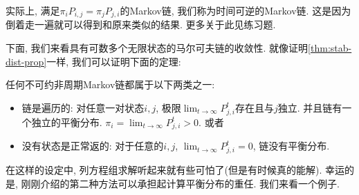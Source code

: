 实际上, 满足$\pi_i P_{i, j}=\pi_j P_{j, i}$的Markov链, 我们称为时间可逆的Markov链. 这是因为倒着走一遍就可以得到和原来类似的结果. 更多关于此见练习题. 

下面, 我们来看具有可数多个无限状态的马尔可夫链的收敛性. 就像证明\cref{thm:stab-dist-prop}一样, 我们可以证明下面的定理: 

\begin{theorem}
    任何不可约非周期Markov链都属于以下两类之一: 
    \begin{itemize}
        \item 链是遍历的: 对任意一对状态$i,j$, 极限$\lim _{t \rightarrow \infty} P_{j, i}^t$存在且与$j$独立. 并且链有一个独立的平衡分布. $\pi_i = \lim _{t \rightarrow \infty} P_{j, i}^t>0$. 或者
        \item 没有状态是正常返的: 对于任意的$i,j$, $\lim _{t \rightarrow \infty} P_{j, i}^t=0$, 链没有平衡分布. 
    \end{itemize}
\end{theorem}

在这样的设定中, 列方程组求解听起来就有些可怕了(但是有时候真的能解). 幸运的是, 刚刚介绍的第二种方法可以承担起计算平衡分布的重任. 我们来看一个例子. 

